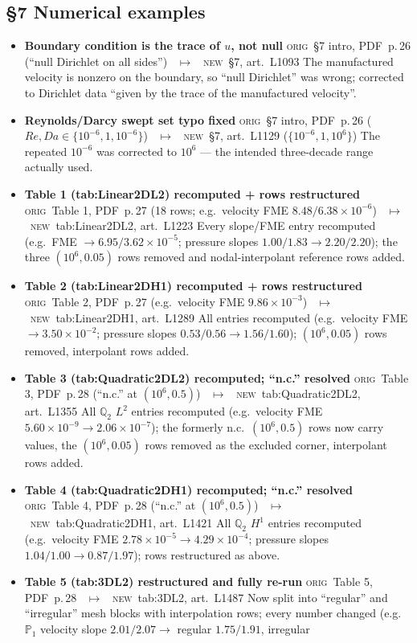 \documentclass[11pt]{article}
\newcommand{\Orig}{\textcolor{origc}{\footnotesize\textsc{orig}}}
\newcommand{\New}{\textcolor{newc}{\footnotesize\textsc{new}}}
\newcommand{\code}[1]{\textcolor{newc}{\ttfamily\small #1}}
\newcommand{\pdfp}[1]{PDF~p.\,#1}
\newcommand{\artl}[1]{art.\ L#1}       %
\newcommand{\ch}[4]{%
  \item \textbf{#1}\newline
    {\footnotesize\Orig\ #2 \ \textcolor{locc}{$\longmapsto$} \ \New\ #3}\newline
    #4}
\begin{document}
\subsection{\S7 Numerical examples}
\begin{itemize}
\ch{Boundary condition is the trace of $u$, not null}
   {\S7 intro, \pdfp{26} (``null Dirichlet on all sides'')}
   {\S7, \artl{1093}}
   {The manufactured velocity is nonzero on the boundary, so ``null Dirichlet'' was wrong; corrected
    to Dirichlet data ``given by the trace of the manufactured velocity''.}
\ch{Reynolds/Darcy swept set typo fixed}
   {\S7 intro, \pdfp{26} ($Re,Da\in\{10^{-6},1,10^{-6}\}$)}
   {\S7, \artl{1129} ($\{10^{-6},1,10^{6}\}$)}
   {The repeated $10^{-6}$ was corrected to $10^{6}$ --- the intended three-decade range actually used.}
\ch{Table 1 (\code{tab:Linear2DL2}) recomputed + rows restructured}
   {Table 1, \pdfp{27} (18 rows; e.g.\ velocity FME $8.48/6.38\!\times\!10^{-6}$)}
   {\code{tab:Linear2DL2}, \artl{1223}}
   {Every slope/FME entry recomputed (e.g.\ FME $\to6.95/3.62\!\times\!10^{-5}$; pressure slopes
    $1.00/1.83\to2.20/2.20$); the three $(10^6,0.05)$ rows removed and nodal-interpolant reference rows
    added.}
\ch{Table 2 (\code{tab:Linear2DH1}) recomputed + rows restructured}
   {Table 2, \pdfp{27} (e.g.\ velocity FME $9.86\!\times\!10^{-3}$)}
   {\code{tab:Linear2DH1}, \artl{1289}}
   {All entries recomputed (e.g.\ velocity FME $\to3.50\!\times\!10^{-2}$; pressure slopes
    $0.53/0.56\to1.56/1.60$); $(10^6,0.05)$ rows removed, interpolant rows added.}
\ch{Table 3 (\code{tab:Quadratic2DL2}) recomputed; ``n.c.'' resolved}
   {Table 3, \pdfp{28} (``n.c.'' at $(10^6,0.5)$)}
   {\code{tab:Quadratic2DL2}, \artl{1355}}
   {All $\mathbb{Q}_2$ $L^2$ entries recomputed (e.g.\ velocity FME $5.60\!\times\!10^{-9}\to2.06\!\times\!10^{-7}$);
    the formerly n.c.\ $(10^6,0.5)$ rows now carry values, the $(10^6,0.05)$ rows removed as the
    excluded corner, interpolant rows added.}
\ch{Table 4 (\code{tab:Quadratic2DH1}) recomputed; ``n.c.'' resolved}
   {Table 4, \pdfp{28} (``n.c.'' at $(10^6,0.5)$)}
   {\code{tab:Quadratic2DH1}, \artl{1421}}
   {All $\mathbb{Q}_2$ $H^1$ entries recomputed (e.g.\ velocity FME $2.78\!\times\!10^{-5}\to4.29\!\times\!10^{-4}$;
    pressure slopes $1.04/1.00\to0.87/1.97$); rows restructured as above.}
\ch{Table 5 (\code{tab:3DL2}) restructured and fully re-run}
   {Table 5, \pdfp{28}}
   {\code{tab:3DL2}, \artl{1487}}
   {Now split into ``regular'' and ``irregular'' mesh blocks with interpolation rows; every number
    changed (e.g.\ $\mathbb{P}_1$ velocity slope $2.01/2.07\to$ regular $1.75/1.91$, irregular
}
\end{itemize}
\end{document}
